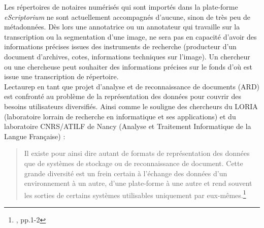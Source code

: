 Les répertoires de notaires numérisés qui sont importés dans la plate-forme \textit{eScriptorium} ne sont actuellement accompagnés d'aucune, sinon de très peu de métadonnées. Dès lors une annotatrice ou un annotateur qui travaille sur la transcription ou la segmentation d'une image, ne sera pas en capacité d'avoir des informations précises issues des instruments de recherche (producteur d'un document d'archives, cotes, informations techniques sur l'image). Un chercheur ou une chercheuse peut souhaiter des informations précises sur le fonds d'où est issue une transcription de répertoire.\\ 

Lectaurep en tant que projet d'analyse et de reconnaissance de documents (ARD) est confronté au problème de la représentation des données pour couvrir des besoins utilisateurs diversifiés. Ainsi comme le souligne des chercheurs du LORIA (laboratoire lorrain de recherche en informatique et ses applications) et du laboratoire CNRS/ATILF de Nancy (Analyse et Traitement Informatique de la Langue Française) : 
\begin{quote}
    Il existe pour ainsi dire autant de formats de représentation des données que de systèmes de stockage ou de reconnaissance de document. Cette grande diversité est un frein certain à l'échange des données d'un environnement à un autre, d'une plate-forme à une autre et rend souvent les sorties de certains systèmes utilisables uniquement par eux-mêmes.\footnote{\cite{belaid_representation_2007}, pp.1-2}
\end{quote}

